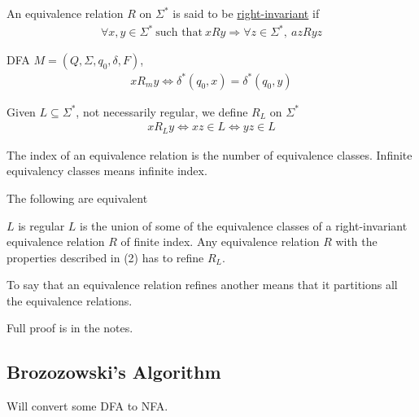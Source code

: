 \documentclass[../598comp.tex]{subfiles}
\begin{document}
\begin{definition}
  An equivalence relation $R$ on $\Sigma^*$ is said to be \ul{right-invariant} if 
  \begin{gather*}
    \forall x, y \in \Sigma^* \ \text{such that} \ xRy \Rightarrow \forall z \in \Sigma^*, \ azRyz
  \end{gather*} 
  \begin{example}
    DFA $M = (Q, \Sigma, q_0, \delta, F)$,
    \begin{gather*}
      xR_m y \Leftrightarrow \delta^*(q_0, x) = \delta^*(q_0, y)
    \end{gather*} 
  \end{example} 
  \begin{example}
    Given $L \subseteq \Sigma^*$, not necessarily regular, we define $R_L$ on $\Sigma^*$
    \begin{gather*}
      xR_Ly \Leftrightarrow xz \in L \Leftrightarrow yz \in L
    \end{gather*} 
  \end{example} 
\end{definition} 

\begin{note}
  The index of an equivalence relation is the number of equivalence classes. Infinite equivalency classes means infinite index.
\end{note} 

\begin{theorem}
  The following are equivalent
  \begin{enumerate}
    \ii
    $L$ is regular
    \ii
    $L$ is the union of some of the equivalence classes of a right-invariant equivalence relation $R$ of finite index.
    \ii
    Any equivalence relation $R$ with the properties described in (2) has to refine $R_L$.
  \end{enumerate} 
  \begin{note}
    To say that an equivalence relation refines another means that it partitions all the equivalence relations.
  \end{note} 
  Full proof is in the notes.
\end{theorem} 

\subsection{Brozozowski's Algorithm}

Will convert some DFA to NFA. 
\end{document}
